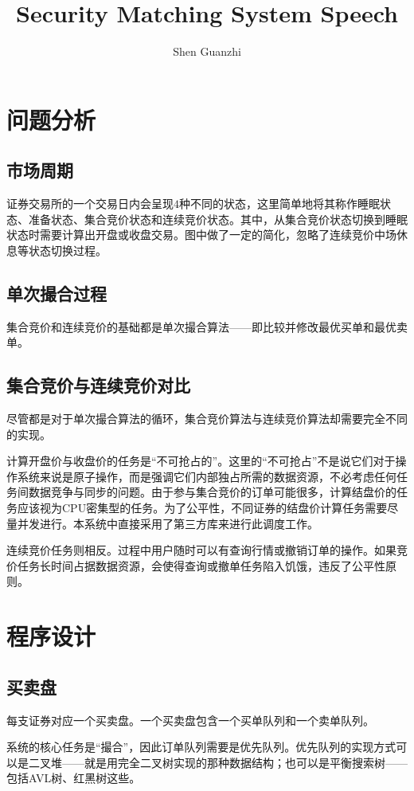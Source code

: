 \documentclass{ctexrep}
\title{Security Matching System Speech}
\author{Shen Guanzhi}
\begin{document}
\maketitle

\chapter{问题分析}
\section{市场周期}
证券交易所的一个交易日内会呈现$4$种不同的状态，这里简单地将其称作睡眠状态、准备状态、集合竞价状态和连续竞价状态。其中，从集合竞价状态切换到睡眠状态时需要计算出开盘或收盘交易。图中做了一定的简化，忽略了连续竞价中场休息等状态切换过程。

\section{单次撮合过程}
集合竞价和连续竞价的基础都是单次撮合算法——即比较并修改最优买单和最优卖单。

\section{集合竞价与连续竞价对比}
尽管都是对于单次撮合算法的循环，集合竞价算法与连续竞价算法却需要完全不同的实现。

计算开盘价与收盘价的任务是“不可抢占的”。这里的“不可抢占”不是说它们对于操作系统来说是原子操作，而是强调它们内部独占所需的数据资源，不必考虑任何任务间数据竞争与同步的问题。由于参与集合竞价的订单可能很多，计算结盘价的任务应该视为CPU密集型的任务。为了公平性，不同证券的结盘价计算任务需要尽量并发进行。本系统中直接采用了第三方库来进行此调度工作。

连续竞价任务则相反。过程中用户随时可以有查询行情或撤销订单的操作。如果竞价任务长时间占据数据资源，会使得查询或撤单任务陷入饥饿，违反了公平性原则。

\chapter{程序设计}
\section{买卖盘}
每支证券对应一个买卖盘。一个买卖盘包含一个买单队列和一个卖单队列。

系统的核心任务是“撮合”，因此订单队列需要是优先队列。优先队列的实现方式可以是二叉堆——就是用完全二叉树实现的那种数据结构；也可以是平衡搜索树——包括AVL树、红黑树这些。
\end{document}
